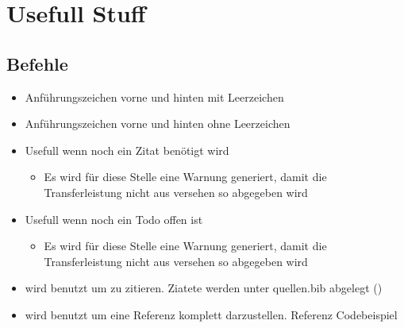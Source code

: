 \section{Usefull Stuff}

\subsection{Befehle}
\begin{itemize}
    \item {} Anführungszeichen vorne und hinten mit Leerzeichen
    \item {} Anführungszeichen vorne und hinten ohne Leerzeichen
    \item {} Usefull wenn noch ein Zitat benötigt wird
    \begin{itemize} 
        \item Es wird für diese Stelle eine Warnung generiert, damit die Transferleistung nicht aus versehen so abgegeben wird
    \end{itemize}
    \item {} Usefull wenn noch ein Todo offen ist
    \begin{itemize} 
        \item Es wird für diese Stelle eine Warnung generiert, damit die Transferleistung nicht aus versehen so abgegeben wird
    \end{itemize}
    \item {} wird benutzt um zu zitieren. Ziatete werden unter quellen.bib abgelegt (\cite{OOPOverview})
    \item {} wird benutzt um eine Referenz komplett darzustellen. Referenz Codebeispiel 
\end{itemize}

\newpage
